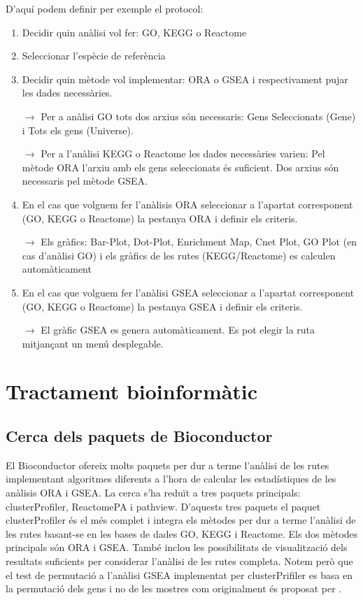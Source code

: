 D'aquí podem definir per exemple el protocol:
\begin{enumerate}
\item Decidir quin anàlisi vol fer: \gls{GO}, \gls{KEGG} o Reactome
\item Seleccionar l'espècie de referència
\item Decidir quin mètode vol implementar: \gls{ORA} o \gls{GSEA} i respectivament pujar les dades necessàries.

$\rightarrow$ Per a anàlisi \gls{GO} tots dos arxius són necessaris: Gens Seleccionats (Gene) i Tots els gens (Universe). 

$\rightarrow$ Per a l'anàlisi \gls{KEGG} o Reactome les dades necessàries varien: Pel mètode \gls{ORA} l'arxiu amb els gens seleccionats és suficient. Dos arxius són necessaris pel mètode \gls{GSEA}.
\item En el cas que volguem fer l'anàlisis \gls{ORA} seleccionar a l'apartat corresponent (\gls{GO}, \gls{KEGG} o Reactome) la pestanya \gls{ORA} i definir els criteris.

$\rightarrow$ Els gràfics: \gls{Bar-Plot}, \gls{Dot-Plot}, \gls{Enrichment Map}, Cnet Plot, GO Plot (en cas d'anàlisi \gls{GO}) i els gràfics de les rutes (\gls{KEGG}/Reactome) es calculen automàticament

\item En el cas que volguem fer l'anàlisi \gls{GSEA} seleccionar a l'apartat corresponent (\gls{GO}, \gls{KEGG} o Reactome) la pestanya \gls{GSEA} i definir els criteris.

$\rightarrow$ El gràfic GSEA es genera automàticament. Es pot elegir la ruta mitjançant un menú desplegable.

\end{enumerate}

\chapter{Tractament bioinformàtic}

\section{Cerca dels paquets de \gls{Bioconductor}}
El \gls{Bioconductor} ofereix molts paquets per dur a terme l'anàlisi de les rutes implementant algoritmes diferents a l'hora de calcular les estadístiques de les anàlisis \gls{ORA} i \gls{GSEA}. La cerca s'ha reduït a tres paquets principals: clusterProfiler, ReactomePA i pathview. D'aquests tres paquets el paquet clusterProfiler és el més complet i integra els mètodes per dur a terme l'anàlisi de les rutes basant-se en les bases de dades \gls{GO}, \gls{KEGG} i Reactome. Els dos mètodes principals són \gls{ORA} i \gls{GSEA}. També inclou les possibilitats de visualització dels resultats suficients per considerar l'anàlisi de les rutes completa. Notem però que el test de permutació a l'anàlisi \gls{GSEA} implementat per clusterPrifiler es basa en la permutació dels gens i no de les mostres com originalment és proposat per \cite{subramanian2005gene}.

